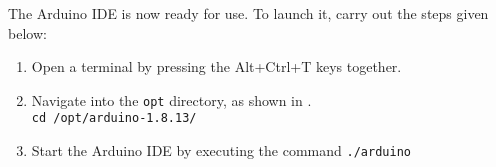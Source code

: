 \begin{enumerate}
            
\end{enumerate}
The Arduino IDE is now ready for use. To launch it, carry out the steps given below:
\begin{enumerate}
      \item Open a terminal by pressing the Alt+Ctrl+T keys together.
      \item Navigate into the {\tt opt} directory, as shown in .\\
      {\tt cd /opt/arduino-1.8.13/}
      \item Start the Arduino IDE by executing the command {\tt ./arduino}
\end{enumerate}



